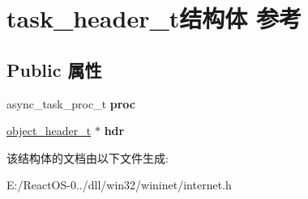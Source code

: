 \hypertarget{structtask__header__t}{}\section{task\+\_\+header\+\_\+t结构体 参考}
\label{structtask__header__t}
\subsection*{Public 属性}
\begin{DoxyCompactItemize}
\item 
\mbox{\label{structtask__header__t_afacd269dd6c40593caa44101eee28dae}} 
async\+\_\+task\+\_\+proc\+\_\+t {\bfseries proc}
\item 
\mbox{\label{structtask__header__t_a348c6f9003cf7b45ff470841a005921a}} 
\hyperlink{struct__object__header__t}{object\+\_\+header\+\_\+t} $\ast$ {\bfseries hdr}
\end{DoxyCompactItemize}


该结构体的文档由以下文件生成\+:\begin{DoxyCompactItemize}
\item 
E\+:/\+React\+O\+S-\/0../dll/win32/wininet/internet.\+h\end{DoxyCompactItemize}
